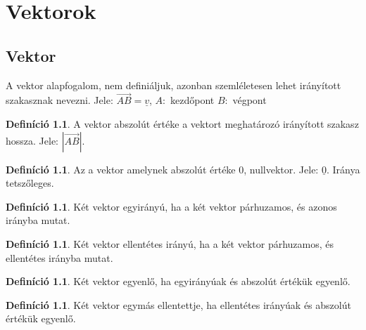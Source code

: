\documentclass[twoside,12pt]{report}
\renewcommand{\vec}{\underline}
\theoremstyle{definition}
\newtheorem{definition}[theorem]{Definíció}
\begin{document}
\chapter{Vektorok}
\section{Vektor}
	A vektor alapfogalom, nem definiáljuk, azonban szemléletesen lehet irányított szakasznak nevezni. Jele: $\overrightarrow{AB}=\vec{v}$, $A:$ kezdőpont $B:$ végpont
	\begin{definition}
		A vektor abszolút értéke a vektort meghatározó irányított szakasz hossza. Jele: $|\overrightarrow{AB}|$.
	\end{definition}
	\begin{definition}
		Az a vektor amelynek abszolút értéke 0, nullvektor. Jele: $\vec{0}$. Iránya tetszőleges.
	\end{definition}
	\begin{definition}
		Két vektor egyirányú, ha a két vektor párhuzamos, és azonos irányba mutat.
	\end{definition}
	\begin{definition}
		Két vektor ellentétes irányú, ha a két vektor párhuzamos, és ellentétes irányba mutat.
	\end{definition}
	\begin{definition}
		Két vektor egyenlő, ha egyirányúak és abszolút értékük egyenlő.
	\end{definition}
	\begin{definition}
		Két vektor egymás ellentettje, ha ellentétes irányúak és abszolút értékük egyenlő.
	\end{definition}
\end{document}
